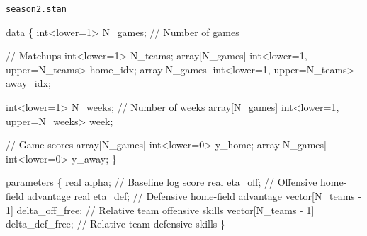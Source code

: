 \documentclass[
  letterpaper,
  DIV=11,
  numbers=noendperiod]{scrartcl}
\newenvironment{Shaded}{\begin{snugshade}}{\end{snugshade}}
\newcommand{\CommentTok}[1]{\textcolor[rgb]{0.37,0.37,0.37}{#1}}
\newcommand{\DataTypeTok}[1]{\textcolor[rgb]{0.68,0.00,0.00}{#1}}
\newcommand{\DecValTok}[1]{\textcolor[rgb]{0.68,0.00,0.00}{#1}}
\newcommand{\KeywordTok}[1]{\textcolor[rgb]{0.00,0.23,0.31}{#1}}
\newcommand{\NormalTok}[1]{\textcolor[rgb]{0.00,0.23,0.31}{#1}}
\begin{document}
\begin{codelisting}

\caption{\texttt{season2.stan}}

\begin{Shaded}
\begin{Highlighting}[]
\KeywordTok{data}\NormalTok{ \{}
  \DataTypeTok{int}\NormalTok{\textless{}}\KeywordTok{lower}\NormalTok{=}\DecValTok{1}\NormalTok{\textgreater{} N\_games; }\CommentTok{// Number of games}

  \CommentTok{// Matchups}
  \DataTypeTok{int}\NormalTok{\textless{}}\KeywordTok{lower}\NormalTok{=}\DecValTok{1}\NormalTok{\textgreater{} N\_teams;}
  \DataTypeTok{array}\NormalTok{[N\_games] }\DataTypeTok{int}\NormalTok{\textless{}}\KeywordTok{lower}\NormalTok{=}\DecValTok{1}\NormalTok{, }\KeywordTok{upper}\NormalTok{=N\_teams\textgreater{} home\_idx;}
  \DataTypeTok{array}\NormalTok{[N\_games] }\DataTypeTok{int}\NormalTok{\textless{}}\KeywordTok{lower}\NormalTok{=}\DecValTok{1}\NormalTok{, }\KeywordTok{upper}\NormalTok{=N\_teams\textgreater{} away\_idx;}

  \DataTypeTok{int}\NormalTok{\textless{}}\KeywordTok{lower}\NormalTok{=}\DecValTok{1}\NormalTok{\textgreater{} N\_weeks; }\CommentTok{// Number of weeks}
  \DataTypeTok{array}\NormalTok{[N\_games] }\DataTypeTok{int}\NormalTok{\textless{}}\KeywordTok{lower}\NormalTok{=}\DecValTok{1}\NormalTok{, }\KeywordTok{upper}\NormalTok{=N\_weeks\textgreater{} week;}

  \CommentTok{// Game scores}
  \DataTypeTok{array}\NormalTok{[N\_games] }\DataTypeTok{int}\NormalTok{\textless{}}\KeywordTok{lower}\NormalTok{=}\DecValTok{0}\NormalTok{\textgreater{} y\_home;}
  \DataTypeTok{array}\NormalTok{[N\_games] }\DataTypeTok{int}\NormalTok{\textless{}}\KeywordTok{lower}\NormalTok{=}\DecValTok{0}\NormalTok{\textgreater{} y\_away;}
\NormalTok{\}}

\KeywordTok{parameters}\NormalTok{ \{}
  \DataTypeTok{real}\NormalTok{ alpha;                         }\CommentTok{// Baseline log score}
  \DataTypeTok{real}\NormalTok{ eta\_off;                       }\CommentTok{// Offensive home{-}field advantage}
  \DataTypeTok{real}\NormalTok{ eta\_def;                       }\CommentTok{// Defensive home{-}field advantage}
  \DataTypeTok{vector}\NormalTok{[N\_teams {-} }\DecValTok{1}\NormalTok{] delta\_off\_free; }\CommentTok{// Relative team offensive skills}
  \DataTypeTok{vector}\NormalTok{[N\_teams {-} }\DecValTok{1}\NormalTok{] delta\_def\_free; }\CommentTok{// Relative team defensive skills}
\NormalTok{\}}


\end{Highlighting}
\end{Shaded}
\end{codelisting}
\end{document}
